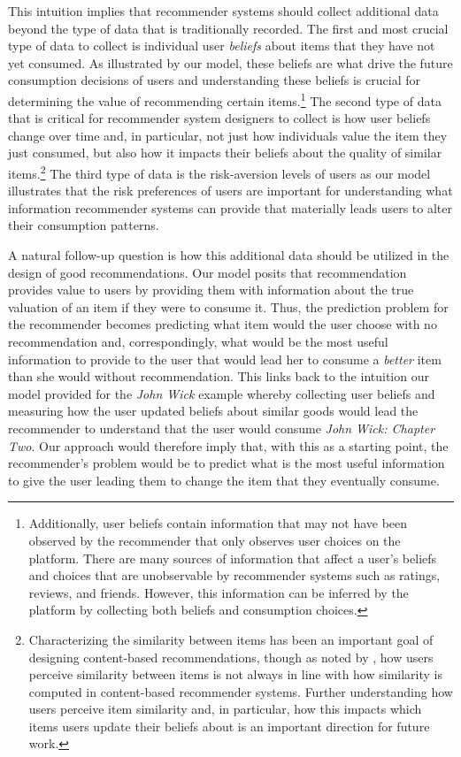 \documentclass[format=acmsmall, review=false]{acmart}
\begin{document}
This intuition implies that recommender systems should collect additional data beyond the type of data that is traditionally recorded. The first and most crucial type of data to collect is individual user \textit{beliefs} about items that they have not yet consumed. As illustrated by our model, these beliefs are what drive the future consumption decisions of users and understanding these beliefs is crucial for determining the value of recommending certain items.\footnote{Additionally, user beliefs contain information that may not have been observed by the recommender that only observes user choices on the platform. There are many sources of information that affect a user's beliefs and choices that are unobservable by recommender systems such as ratings, reviews, and friends. However, this information can be inferred by the platform by collecting both beliefs and consumption choices.} The second type of data that is critical for recommender system designers to collect is how user beliefs change over time and, in particular, not just how individuals value the item they just consumed, but also how it impacts their beliefs about the quality of similar items.\footnote{Characterizing the similarity between items has been an important goal of designing content-based recommendations, though as noted by \cite{winecoff2019users}, how users perceive similarity between items is not always in line with how similarity is computed in content-based recommender systems. Further understanding how users perceive item similarity and, in particular, how this impacts which items users update their beliefs about is an important direction for future work.} The third type of data is the risk-aversion levels of users as our model illustrates that the risk preferences of users are important for understanding what information recommender systems can provide that materially leads users to alter their consumption patterns.
\par 
A natural follow-up question is how this additional data should be utilized in the design of good recommendations. Our model posits that recommendation provides value to users by providing them with information about the true valuation of an item if they were to consume it. Thus, the prediction problem for the recommender becomes predicting what item would the user choose with no recommendation and, correspondingly, what would be the most useful information to provide to the user that would lead her to consume a \textit{better} item than she would without recommendation. This links back to the intuition our model provided for the \textit{John Wick} example whereby collecting user beliefs and measuring how the user updated beliefs about similar goods would lead the recommender to understand that the user would consume \textit{John Wick: Chapter Two}. Our approach would therefore imply that, with this as a starting point, the recommender's problem would be to predict what is the most useful information to give the user leading them to change the item that they eventually consume.
\end{document}

